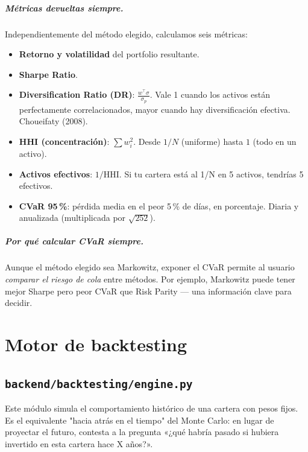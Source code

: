\documentclass[11pt,a4paper]{book}
\begin{document}
\paragraph{Métricas devueltas siempre.} Independientemente del método elegido, calculamos seis métricas:
\begin{itemize}
  \item \textbf{Retorno y volatilidad} del portfolio resultante.
  \item \textbf{Sharpe Ratio}.
  \item \textbf{Diversification Ratio (DR)}: $\frac{w^\top \sigma}{\sigma_p}$. Vale 1 cuando los activos están perfectamente correlacionados, mayor cuando hay diversificación efectiva. Choueifaty (2008).
  \item \textbf{HHI (concentración)}: $\sum w_i^2$. Desde $1/N$ (uniforme) hasta $1$ (todo en un activo).
  \item \textbf{Activos efectivos}: $1/\mathrm{HHI}$. Si tu cartera está al 1/N en 5 activos, tendrías 5 efectivos.
  \item \textbf{CVaR 95\,\%}: pérdida media en el peor 5\,\% de días, en porcentaje. Diaria y anualizada (multiplicada por $\sqrt{252}$).
\end{itemize}

\paragraph{Por qué calcular CVaR siempre.} Aunque el método elegido sea Markowitz, exponer el CVaR permite al usuario \emph{comparar el riesgo de cola} entre métodos. Por ejemplo, Markowitz puede tener mejor Sharpe pero peor CVaR que Risk Parity --- una información clave para decidir.

\chapter{Motor de backtesting}

\section{\texttt{backend/backtesting/engine.py}}

Este módulo simula el comportamiento histórico de una cartera con pesos fijos. Es el equivalente "hacia atrás en el tiempo" del Monte Carlo: en lugar de proyectar el futuro, contesta a la pregunta «¿qué habría pasado si hubiera invertido en esta cartera hace X años?».
\end{document}

